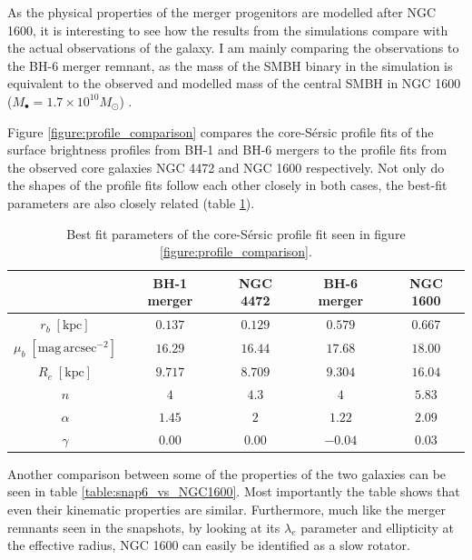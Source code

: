 \documentclass[english, oneside]{HYgradu}
\begin{document}
As the physical properties of the merger progenitors are modelled after NGC 1600, it is interesting to see how the results from the simulations compare with the actual observations of the galaxy. I am mainly comparing the observations to the BH-6 merger remnant, as the mass of the SMBH binary in the simulation is equivalent to the observed and modelled mass of the central SMBH in NGC 1600 ($M_\bullet = 1.7 \times 10^{10} M_\odot$) \citep{Thomas2016}.

Figure \ref{figure:profile_comparison} compares the core-Sérsic profile fits of the surface brightness profiles from BH-1 and BH-6 mergers to the profile fits from the observed core galaxies NGC 4472 and NGC 1600 respectively. Not only do the shapes of the profile fits follow each other closely in both cases, the best-fit parameters are also closely related (table \ref{table:bestfit_parameter_comparison}). 

\begin{table}
	\begin{center}
		\scriptsize
		\begin{tabular}{| c | c c | c c |}
		\hline
		 & BH-1 merger & NGC 4472 & BH-6 merger & NGC 1600 \\
		\hline
		$r_b \; \mathrm{[kpc]}$ & $0.137$ & $0.129$ & $0.579$ & $0.667$ \\
		$\mu_b \; \mathrm{[mag \, arcsec^{-2}]}$ & $16.29$ & $16.44$ & $17.68$ & $18.00$ \\
		$R_e \; \mathrm{[kpc]}$ & $9.717$ & $8.709$ & $9.304$ & $16.04$ \\
		$n$ & $4$ & $4.3$ & $4$ & $5.83$ \\
		$\alpha$ & $1.45$ & $2$ & $1.22$ & $2.09$ \\
		$\gamma$ & $0.00$ & $0.00$ & $-0.04$ & $0.03$ \\
		\hline
		\end{tabular}
	\end{center}
	\caption{Best fit parameters of the core-Sérsic profile fit seen in figure \ref{figure:profile_comparison}.}
	\label{table:bestfit_parameter_comparison}
\end{table}

Another comparison between some of the properties of the two galaxies can be seen in table \ref{table:snap6_vs_NGC1600}. Most importantly the table shows that even their kinematic properties are similar. Furthermore, much like the merger remnants seen in the snapshots, by looking at its $\lambda_e$ parameter and ellipticity at the effective radius, NGC 1600 can easily be identified as a slow rotator.
\end{document}
